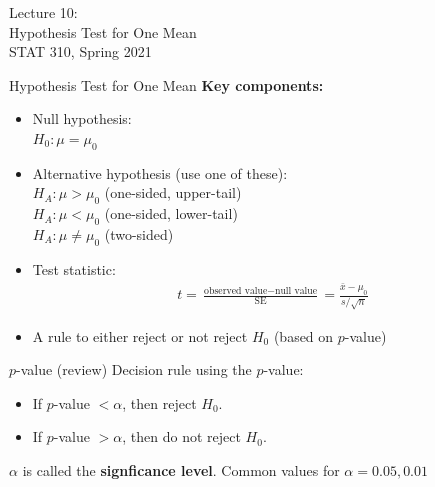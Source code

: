 \documentclass[fleqn, 10pt]{beamer}\usepackage[]{graphicx}\usepackage[]{color}
\begin{document}
\begin{frame}
\large
Lecture 10:\\
Hypothesis Test for One Mean\\
STAT 310, Spring 2021
\normalsize
\end{frame}

\begin{frame}{Hypothesis Test for One Mean}
\textbf{Key components:}
\vspace{5pt}
\begin{itemize}
\item Null hypothesis:\\
$H_0: \mu = \mu_0$
\vspace{5pt}
\item Alternative hypothesis (use one of these):\\
$H_A: \mu > \mu_0$ (one-sided, upper-tail)\\
$H_A: \mu < \mu_0$ (one-sided, lower-tail)\\
$H_A: \mu \neq \mu_0$ (two-sided)
\vspace{5pt}
\item Test statistic:
\begin{align*}
t = \frac{\text{observed value} - \text{null value}}{\text{SE}} = \frac{\bar{x} - \mu_0}{s / \sqrt{n}}
\end{align*}
\item A rule to either reject or not reject $H_0$ (based on $p$-value)
\end{itemize}
\end{frame}

\begin{frame}{$p$-value (review)}
Decision rule using the $p$-value:
\vspace{5pt}
\begin{itemize}
\item If $p$-value $< \alpha$, then reject $H_0$.
\item If $p$-value $> \alpha$, then do not reject $H_0$.
\end{itemize}
\vspace{10pt}
$\alpha$ is called the \textbf{signficance level}.  Common values for $\alpha=0.05, 0.01$\\
\end{frame}
\end{document}

